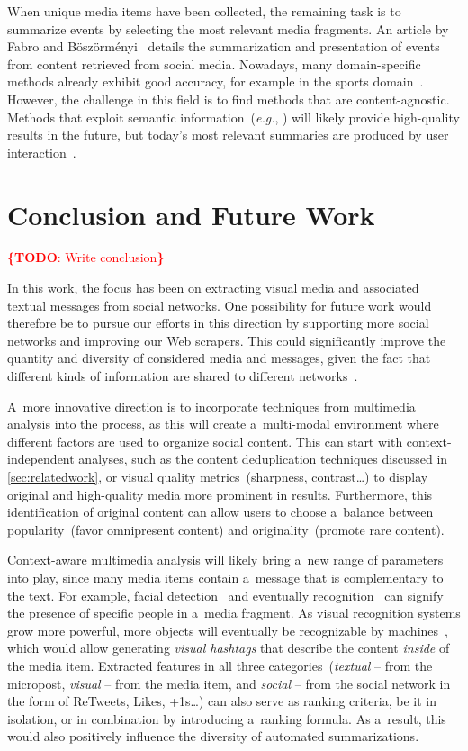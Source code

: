 \documentclass{acm_proc_article-sp}
\let\oldemph\emph
\renewcommand{\emph}[1]{\oldemph{\fontsize{9}{9}\selectfont #1}}
\newcommand{\todo}[1]{\noindent\textcolor{red}{{\bf \{TODO}: #1{\bf \}}}}
\begin{document}
When unique media items have been collected, the remaining task is to summarize events by selecting the most relevant media fragments.
An article by Fabro and B\"osz\"orm\'enyi~\cite{Fabro2012} details the summarization and presentation of events from content retrieved from social media.
Nowadays, many domain-specific methods already exhibit good accuracy, for example in the sports domain~\cite{Li1,Li2}.
However, the challenge in this field is to find methods that are content-agnostic.
Methods that exploit semantic information~(\emph{e.g.}, \cite{Chen}) will likely provide high-quality results in the future,
but today's most relevant summaries are produced by user interaction~\cite{Olsen}.


\section{Conclusion and Future Work}
\todo{Write conclusion}

In this work, the focus has been on extracting visual media and associated textual messages from social networks.
One possibility for future work would therefore be to pursue our efforts in this direction by supporting more social networks and improving our Web scrapers.
This could significantly improve the quantity and diversity of considered media and messages,
given the fact that different kinds of information are shared to different networks~\cite{ConsumersLook}.

A~more innovative direction is to incorporate techniques from multimedia analysis into the process,
as this will create a~multi-modal environment where different factors are used to organize social content.
This can start with context-independent analyses, such as the content deduplication techniques discussed in \autoref{sec:relatedwork},
or visual quality metrics~(sharpness, contrast\ldots) to display original and high-quality media more prominent in results.
Furthermore, this identification of original content can allow users to choose a~balance between popularity~(favor omnipresent content) and originality~(promote rare content).

Context-aware multimedia analysis will likely bring a~new range of parameters into play,
since many media items contain a~message that is complementary to the text.
For example, facial detection~\cite{ViolaJones} and eventually recognition~\cite{Wright}
can signify the presence of specific people in a~media fragment.
As visual recognition systems grow more powerful, more objects will eventually be recognizable by machines~\cite{Serre},
which would allow generating \emph{visual hashtags} that describe the content \emph{inside} of the media item.
Extracted features in all three categories~(\emph{textual} -- from the micropost,
\emph{visual} -- from the media item,
and \emph{social} -- from the social network in the form of ReTweets, Likes, +1s\ldots)
can also
serve as ranking criteria, be it in isolation, or in combination by
introducing a~ranking formula.
As a~result, this would also positively influence the diversity of automated summarizations.
\end{document}
